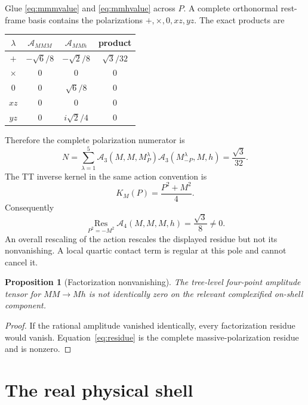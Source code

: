 \documentclass[11pt]{article}
\newtheorem{proposition}[theorem]{Proposition}
\theoremstyle{definition}
\theoremstyle{remark}
\newcommand{\Res}{\operatorname*{Res}}
\begin{document}
Glue \eqref{eq:mmmvalue} and \eqref{eq:mmhvalue} across $P$.  A complete
orthonormal rest-frame basis contains the polarizations
$+,\times,0,xz,yz$.  The exact products are
\begin{center}
\begin{tabular}{c|c|c|c}
\hline
$\lambda$ & $\mathcal A_{MMM}$ & $\mathcal A_{MMh}$ & product\\
\hline
$+$ & $-\sqrt6/8$ & $-\sqrt2/8$ & $\sqrt3/32$\\
$\times$ & $0$ & $0$ & $0$\\
$0$ & $0$ & $\sqrt6/8$ & $0$\\
$xz$ & $0$ & $0$ & $0$\\
$yz$ & $0$ & $i\sqrt2/4$ & $0$\\
\hline
\end{tabular}
\end{center}
Therefore the complete polarization numerator is
\begin{equation}\label{eq:resnum}
N=\sum_{\lambda=1}^{5}
\mathcal A_3(M,M,M_P^\lambda)
\mathcal A_3(M_{-P}^\lambda,M,h)
=\frac{\sqrt3}{32}.
\end{equation}
The TT inverse kernel in the same action convention is
\begin{equation}\label{eq:inversekernel}
K_M(P)=\frac{P^2+M^2}{4}.
\end{equation}
Consequently
\begin{equation}\label{eq:residue}
\boxed{
\Res_{P^2=-M^2}\mathcal A_4(M,M,M,h)=\frac{\sqrt3}{8}\ne0 .}
\end{equation}
An overall rescaling of the action rescales the displayed residue but not
its nonvanishing.  A local quartic contact term is regular at this pole
and cannot cancel it.

\begin{proposition}[Factorization nonvanishing]\label{prop:factorization}
The tree-level four-point amplitude tensor for $MM\to Mh$ is not
identically zero on the relevant complexified on-shell component.
\end{proposition}

\begin{proof}
If the rational amplitude vanished identically, every factorization
residue would vanish.  Equation~\eqref{eq:residue} is the complete
massive-polarization residue and is nonzero.
\end{proof}

\section{The real physical shell}\label{sec:realshell}
\end{document}
